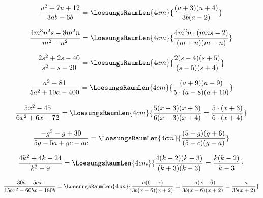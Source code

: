 \begin{bbwAufgabenBlock}
\item $$\frac{u^2 +7u + 12}{3ab - 6b} = \LoesungsRaumLen{4cm}{\frac{(u+3)(u+4)}{3b(a-2)}}$$
\item $$\frac{4m^3n^2s-8m^2n}{m^2-n^2} = \LoesungsRaumLen{4cm}{\frac{4m^2n\cdot{}(mns-2)}{(m+n)(m-n)}}$$\noTRAINER{\newpage}
\item $$\frac{2s^2+2s-40}{s^2-s-20} = \LoesungsRaumLen{4cm}{\frac{2(s-4)(s+5)}{(s-5)(s+4)}}$$
\item $$\frac{a^2-81}{5a^2+10a-400} = \LoesungsRaumLen{4cm}{\frac{(a+9)(a-9)}{5\cdot{}(a-8)(a+10)}}$$\noTRAINER{\newpage}

\item $$\frac{5x^2-45}{6x^2+6x-72} = \LoesungsRaumLen{4cm}{\frac{5(x-3)(x+3)}{6(x-3)(x+4)} = \frac{5\cdot{}(x+3)}{6\cdot{}(x+4)}}$$

\item $$\frac{-g^2-g+30}{5g-5a+gc-ac} = \LoesungsRaumLen{4cm}{\frac{(5-g)(g+6)}{(5+c)(g-a)}}$$\noTRAINER{\newpage}

\item $$\frac{4k^2+4k-24}{k^2-9} = \LoesungsRaumLen{4cm}{\frac{4(k-2)(k+3)}{(k+3)(k-3)} = \frac{k(k-2)}{k-3}}$$

\item $$\frac{30a-5ax}{15bx^2 -60bx -180b} = \LoesungsRaumLen{4cm}{\frac{a(6-x)}{3b(x-6)(x+2)} = \frac{-a(x-6)}{3b(x-6)(x+2)} = \frac{-a}{3b(x+2)}}$$

\end{bbwAufgabenBlock}\newpage





